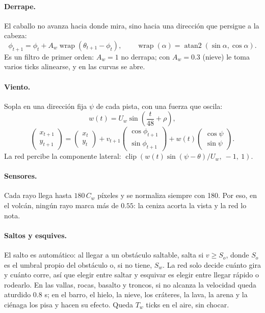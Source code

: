 \documentclass[11pt,letterpaper]{article}
\begin{document}
\paragraph{Derrape.} El caballo no avanza hacia donde mira, sino hacia una dirección que persigue a la cabeza:
\begin{equation}
\phi_{t+1} = \phi_t + A_w \operatorname{wrap}\!\left(\theta_{t+1} - \phi_t\right), \qquad \operatorname{wrap}(\alpha) = \operatorname{atan2}(\sin\alpha, \cos\alpha).
\end{equation}
Es un filtro de primer orden: $A_w = 1$ no derrapa; con $A_w = 0.3$ (nieve) le toma varios ticks alinearse, y en las curvas se abre.

\paragraph{Viento.} Sopla en una dirección fija $\psi$ de cada pista, con una fuerza que oscila:
\begin{equation}
w(t) = U_w \sin\!\left(\frac{t}{48} + \rho\right),
\end{equation}
\begin{equation}
\begin{pmatrix} x_{t+1} \\ y_{t+1} \end{pmatrix} = \begin{pmatrix} x_t \\ y_t \end{pmatrix} + v_{t+1}\begin{pmatrix} \cos\phi_{t+1} \\ \sin\phi_{t+1} \end{pmatrix} + w(t)\begin{pmatrix} \cos\psi \\ \sin\psi \end{pmatrix}.
\end{equation}
La red percibe la componente lateral: $\operatorname{clip}\!\left(w(t)\sin(\psi - \theta)/U_w,\ -1,\ 1\right)$.

\paragraph{Sensores.} Cada rayo llega hasta $180\,C_w$ píxeles y se normaliza siempre con 180. Por eso, en el volcán, ningún rayo marca más de $0.55$: la ceniza acorta la vista y la red lo nota.

\paragraph{Saltos y esquives.} El salto es automático: al llegar a un obstáculo saltable, salta si $v \ge S_o$, donde $S_o$ es el umbral propio del obstáculo o, si no tiene, $S_w$. La red solo decide cuánto gira y cuánto corre, así que elegir entre saltar y esquivar es elegir entre llegar rápido o rodearlo. En las vallas, rocas, basalto y troncos, si no alcanza la velocidad queda aturdido $0.8$ s; en el barro, el hielo, la nieve, los cráteres, la lava, la arena y la ciénaga los pisa y hacen su efecto. Queda $T_w$ ticks en el aire, sin chocar.
\end{document}
